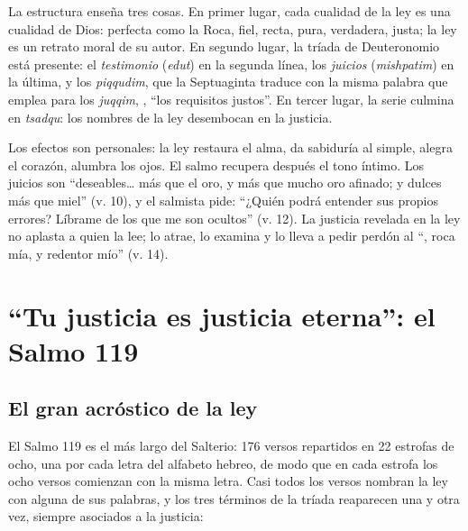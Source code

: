 La estructura enseña tres cosas. En primer lugar, cada cualidad de la ley es una cualidad de Dios: perfecta como la Roca, fiel, recta, pura, verdadera, justa; la ley es un retrato moral de su autor. En segundo lugar, la tríada de Deuteronomio está presente: el \emph{testimonio} (\emph{edut}) en la segunda línea, los \emph{juicios} (\emph{mishpatim}) en la última, y los \emph{piqqudim}, que la Septuaginta traduce con la misma palabra que emplea para los \emph{juqqim}, , ``los requisitos justos''. En tercer lugar, la serie culmina en \emph{tsadqu}: los nombres de la ley desembocan en la justicia.

Los efectos son personales: la ley restaura el alma, da sabiduría al simple, alegra el corazón, alumbra los ojos. El salmo recupera después el tono íntimo. Los juicios son ``deseables\ldots{} más que el oro, y más que mucho oro afinado; y dulces más que miel'' (v. 10), y el salmista pide: ``¿Quién podrá entender sus propios errores? Líbrame de los que me son ocultos'' (v. 12). La justicia revelada en la ley no aplasta a quien la lee; lo atrae, lo examina y lo lleva a pedir perdón al ``\SENOR, roca mía, y redentor mío'' (v. 14).

\section{“Tu justicia es justicia eterna”: el Salmo 119}

\subsection{El gran acróstico de la ley}
El Salmo 119 es el más largo del Salterio: 176 versos repartidos en 22 estrofas de ocho, una por cada letra del alfabeto hebreo, de modo que en cada estrofa los ocho versos comienzan con la misma letra. Casi todos los versos nombran la ley con alguna de sus palabras, y los tres términos de la tríada reaparecen una y otra vez, siempre asociados a la justicia:

